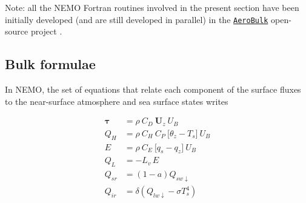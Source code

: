 \documentclass[../main/NEMO_manual]{subfiles}
\begin{document}

Note: all the NEMO Fortran routines involved in the present section have been
initially developed (and are still developed in parallel) in
the \href{https://brodeau.github.io/aerobulk}{\texttt{AeroBulk}} open-source project
\citep{brodeau.barnier.ea_JPO16}.

\subsection{Bulk formulae}
\label{subsec:SBC_blkform}

In NEMO, the set of equations that relate each component of the surface fluxes
to the near-surface atmosphere and sea surface states writes

\begin{subequations}
  \label{eq:SBC_bulk}
  \label{eq:SBC_bulk_form}
  \begin{align}
    \mathbf{\tau} &= \rho~ C_D ~ \mathbf{U}_z  ~ U_B \\
    Q_H           &= \rho~C_H~C_P~\big[ \theta_z - T_s \big] ~ U_B \\
    E             &= \rho~C_E    ~\big[    q_s   - q_z \big] ~ U_B \\
    Q_L           &= -L_v \, E \\
    Q_{sr}        &= (1 - a) Q_{sw\downarrow} \\
    Q_{ir}        &= \delta (Q_{lw\downarrow} -\sigma T_s^4)
  \end{align}
\end{subequations}
\end{document}
